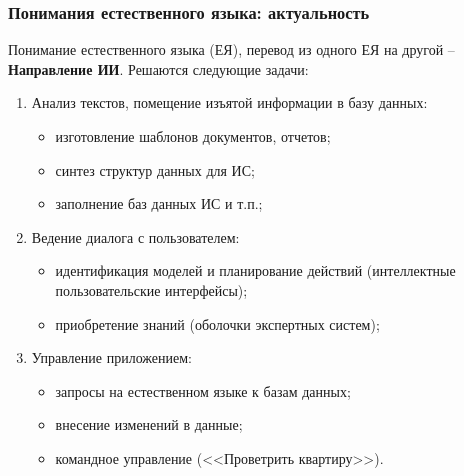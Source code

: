 \documentclass[10pt]{beamer}
\begin{document}
\begin{frame}
  \frametitle{Понимания естественного языка: актуальность}
  \footnotesize
  Понимание естественного языка (ЕЯ), перевод из одного ЕЯ на другой -- \textbf{Направление ИИ}. Решаются следующие задачи:
  \begin{enumerate}
  \item Анализ текстов, помещение изъятой информации в базу данных:
    \begin{itemize}
    \item изготовление шаблонов документов, отчетов;
    \item синтез структур данных для ИС;
    \item заполнение баз данных ИС и т.п.;
    \end{itemize}
  \item Ведение диалога с пользователем:
    \begin{itemize}
    \item идентификация моделей и планирование действий (интеллектные пользовательские интерфейсы);
    \item приобретение знаний (оболочки экспертных систем);
    \end{itemize}
  \item Управление приложением:
    \begin{itemize}
    \item запросы на естественном языке к базам данных;
    \item внесение изменений в данные;
    \item командное управление (<<Проветрить квартиру>>).
    \end{itemize}
  \end{enumerate}
\end{frame}
\end{document}
